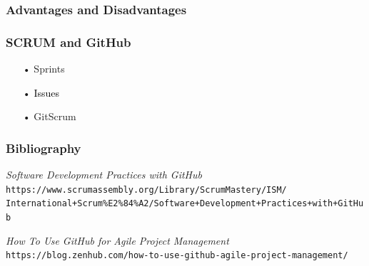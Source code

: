 \documentclass{beamer}
\begin{document}
\begin{frame}
    \frametitle{Advantages and Disadvantages}

    
\end{frame}

\begin{frame}
    \frametitle{SCRUM and GitHub}
 
    \begin{itemize}
    \color{gray}
    \item[•] Sprints
    \item[•] \textcolor{black}{Issues}
    \item[•] GitScrum
    \end{itemize}
    
    
\end{frame}

\begin{frame}
    \frametitle{Bibliography}

	\begin{thebibliography}{10}
	
	\textit{Software Development Practices with GitHub} \\
	\texttt{https://www.scrumassembly.org/Library/ScrumMastery/ISM/\\
	International+Scrum\%E2\%84\%A2/Software+Development+Practices+with+GitHub}
	
	\textit{How To Use GitHub for Agile Project Management} \\
	\texttt{https://blog.zenhub.com/how-to-use-github-agile-project-management/}

	\end{thebibliography}
    
    
\end{frame}
\end{document}
